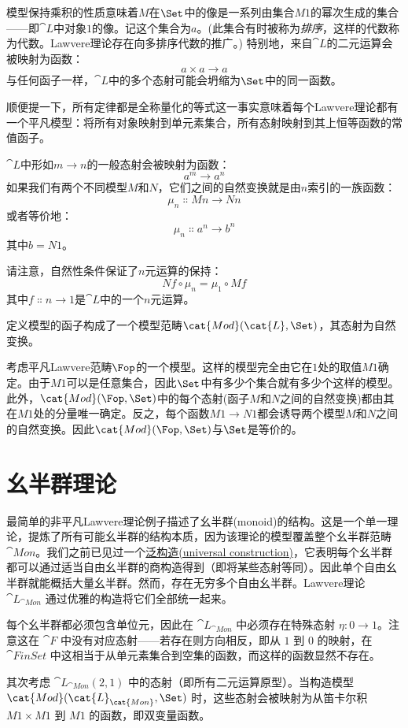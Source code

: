 模型保持乘积的性质意味着$M$在$\Set$中的像是一系列由集合$M 1$的幂次生成的集合——即$\cat{L}$中对象$1$的像。记这个集合为$a$。(此集合有时被称为\emph{排序}，这样的代数称为代数。Lawvere理论存在向多排序代数的推广。) 特别地，来自$\cat{L}$的二元运算会被映射为函数：
$$a \times a \to a$$
与任何函子一样，$\cat{L}$中的多个态射可能会坍缩为$\Set$中的同一函数。

顺便提一下，所有定律都是全称量化的等式这一事实意味着每个Lawvere理论都有一个平凡模型：将所有对象映射到单元素集合，所有态射映射到其上恒等函数的常值函子。

$\cat{L}$中形如$m \to n$的一般态射会被映射为函数：
$$a^m \to a^n$$
如果我们有两个不同模型$M$和$N$，它们之间的自然变换就是由$n$索引的一族函数：
$$\mu_n \Colon M n \to N n$$
或者等价地：
$$\mu_n \Colon a^n \to b^n$$
其中$b = N 1$。

请注意，自然性条件保证了$n$元运算的保持：
$$N f \circ \mu_n = \mu_1 \circ M f$$
其中$f \Colon n \to 1$是$\cat{L}$中的一个$n$元运算。

定义模型的函子构成了一个模型范畴$\cat{Mod}(\cat{L}, \Set)$，其态射为自然变换。

考虑平凡Lawvere范畴$\Fop$的一个模型。这样的模型完全由它在$1$处的取值$M 1$确定。由于$M 1$可以是任意集合，因此$\Set$中有多少个集合就有多少个这样的模型。此外，$\cat{Mod}(\Fop, \Set)$中的每个态射(函子$M$和$N$之间的自然变换)都由其在$M 1$处的分量唯一确定。反之，每个函数$M 1 \to N 1$都会诱导两个模型$M$和$N$之间的自然变换。因此$\cat{Mod}(\Fop, \Set)$与$\Set$是等价的。

\section{幺半群理论}

最简单的非平凡Lawvere理论例子描述了幺半群(monoid)的结构。这是一个单一理论，提炼了所有可能幺半群的结构本质，因为该理论的模型覆盖整个幺半群范畴 $\cat{Mon}$。我们之前已见过一个\hyperref[free-monoids]{泛构造(universal construction)}，它表明每个幺半群都可以通过适当自由幺半群的商构造得到（即将某些态射等同）。因此单个自由幺半群就能概括大量幺半群。然而，存在无穷多个自由幺半群。Lawvere理论 $\cat{L}_{\cat{Mon}}$ 通过优雅的构造将它们全部统一起来。

每个幺半群都必须包含单位元，因此在 $\cat{L}_{\cat{Mon}}$ 中必须存在特殊态射 $\eta: 0 \to 1$。注意这在 $\cat{F}$ 中没有对应态射——若存在则方向相反，即从 $1$ 到 $0$ 的映射，在 $\cat{FinSet}$ 中这相当于从单元素集合到空集的函数，而这样的函数显然不存在。

其次考虑 $\cat{L}_{\cat{Mon}}(2, 1)$ 中的态射（即所有二元运算原型）。当构造模型 $\cat{Mod}(\cat{L}_{\cat{Mon}}, \Set)$ 时，这些态射会被映射为从笛卡尔积 $M 1 \times M 1$ 到 $M 1$ 的函数，即双变量函数。

